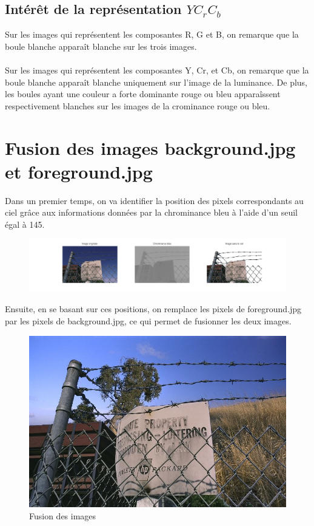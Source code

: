 \documentclass[11pt]{article}
\begin{document}
	\subsection{Intérêt de la représentation $YC_{r}C_{b}$}

		Sur les images qui représentent les composantes R, G et B, on remarque que la boule blanche apparaît blanche sur les trois images.\\
		\\
		Sur les images qui représentent les composantes Y, Cr, et Cb, on remarque que la boule blanche apparaît blanche uniquement sur l'image de la luminance. De plus, les boules ayant une couleur a forte dominante rouge ou bleu apparaîssent respectivement blanches sur les images de la crominance rouge ou bleu.\\




\section{Fusion des images background.jpg et foreground.jpg}
	
	Dans un premier temps, on va identifier la position des pixels correspondants au ciel grâce aux informations données par la chrominance bleu à l'aide d'un seuil égal à 145.\\

		\begin{figure}[h]
			\centering
			\includegraphics[scale=0.25]{img/rapport_img2-1.jpg}
			\label{Q412}
		\end{figure}

	Ensuite, en se basant sur ces positions, on remplace les pixels de foreground.jpg par les pixels de background.jpg, ce qui permet de fusionner les deux images.\\

		\begin{figure}[h]
			\centering
			\includegraphics[scale=0.5]{img/rapport_img2-2.jpg}
			\caption{Fusion des images}
			\label{Q412}
		\end{figure}
\end{document}
